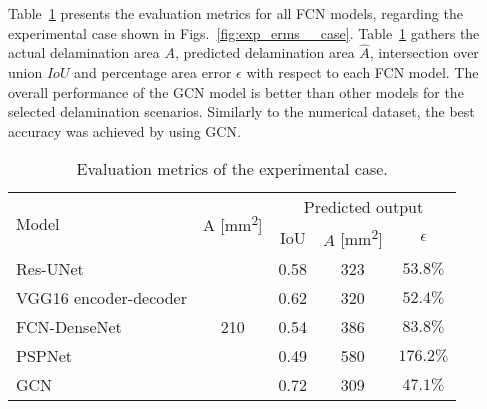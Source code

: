 Table~\ref{tab:rms_exp_case} presents the evaluation metrics for all FCN models, regarding the experimental case shown in Figs.~\ref{fig:exp_erms__case}.
Table~\ref{tab:rms_exp_case} gathers the actual delamination area \(A\), predicted delamination area \(\hat{A}\), intersection over union \(IoU\) and percentage area error \(\epsilon\) with respect to each FCN model. 
The overall performance of the GCN model is better than other models for the selected delamination scenarios.
Similarly to the numerical dataset, the best accuracy was achieved by using GCN.
\begin{table}[!ht]
	\centering
	\caption{Evaluation metrics of the experimental case.}
	\label{tab:rms_exp_case}
	\begin{tabular}{lcccc}
		\toprule
		\multirow{2}{*}{Model} & \multicolumn{1}{c}{\multirow{2}{*}{A [mm\textsuperscript{2}]}} & \multicolumn{3}{c}{Predicted output} \\ 
		\cmidrule(lr){3-5} & & \multicolumn{1}{c}{IoU} & \multicolumn{1}{c}{\(\hat{A}\) [mm\textsuperscript{2}]} & \(\epsilon\) \\ \midrule
		Res-UNet & \multirow{5}{*}{210} & \multicolumn{1}{c}{0.58} & \multicolumn{1}{c}{323}  & \(53.8\%\) \\ 
		VGG16 encoder-decoder &  & \multicolumn{1}{c}{0.62} & \multicolumn{1}{c}{320} & \(52.4\%\) 
		\\ 
		FCN-DenseNet &  & \multicolumn{1}{c}{0.54} & \multicolumn{1}{c}{386} & \(83.8\%\) \\ 
		PSPNet &  & \multicolumn{1}{c}{0.49} & \multicolumn{1}{c}{580} & \(176.2\%\) 
		\\ 
		GCN &  & \multicolumn{1}{c}{0.72} & \multicolumn{1}{c}{309} & \(47.1\%\) 
		\\ 
		\bottomrule
	\end{tabular}		
\end{table}
